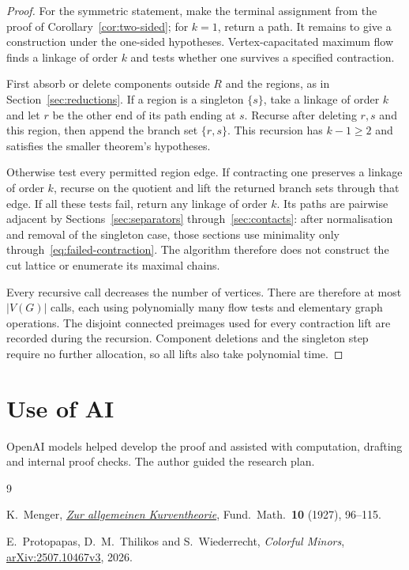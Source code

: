 \documentclass[11pt]{amsart}
\begin{document}
\begin{proof}
For the symmetric statement, make the terminal assignment from the
proof of Corollary~\ref{cor:two-sided}; for $k=1$, return a path.
It remains to give a construction under the one-sided hypotheses.
Vertex-capacitated maximum flow finds a linkage of order $k$ and
tests whether one survives a specified contraction.

First absorb or delete components outside $R$ and the regions, as
in Section~\ref{sec:reductions}. If a region is a singleton
$\{s\}$, take a linkage of order $k$ and let $r$ be the other end
of its path ending at $s$. Recurse after deleting $r,s$ and this
region, then append the branch set $\{r,s\}$. This recursion has
$k-1\geq2$ and satisfies the smaller theorem's hypotheses.

Otherwise test every permitted region edge. If contracting one
preserves a linkage of order $k$, recurse on the quotient and lift
the returned branch sets through that edge. If all these tests fail,
return any linkage of order $k$. Its paths are pairwise adjacent by
Sections~\ref{sec:separators} through~\ref{sec:contacts}: after normalisation
and removal of the singleton case, those sections use minimality
only through~\eqref{eq:failed-contraction}. The algorithm therefore
does not construct the cut lattice or enumerate its maximal chains.

Every recursive call decreases the number of vertices. There are
therefore at most $|V(G)|$ calls, each using polynomially many flow
tests and elementary graph operations. The disjoint connected
preimages used for every contraction lift are recorded during the
recursion. Component deletions and the singleton step require no
further allocation, so all lifts also take polynomial time.
\end{proof}

\section*{Use of AI}
OpenAI models helped develop the proof and assisted with computation,
drafting and internal proof checks. The author guided the research plan.

\begin{thebibliography}{9}
\raggedright
{}
K.~Menger,
\href{https://doi.org/10.4064/fm-10-1-96-115}{\emph{Zur allgemeinen
Kurventheorie}}, Fund.~Math.\ \textbf{10} (1927), 96--115.

E.~Protopapas, D.~M.~Thilikos and S.~Wiederrecht,
\emph{Colorful Minors},
\href{https://arxiv.org/abs/2507.10467v3}{arXiv:2507.10467v3}, 2026.
\end{thebibliography}
\end{document}
